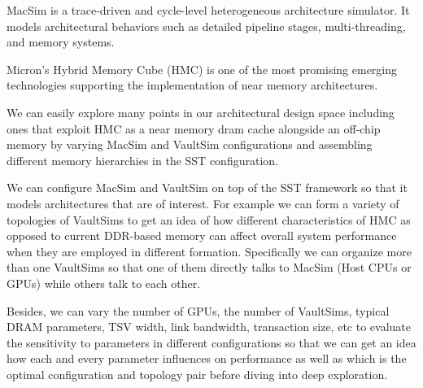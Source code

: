 MacSim \cite{macsim} is a trace-driven and cycle-level heterogeneous architecture simulator.
It models architectural behaviors such as detailed pipeline stages, multi-threading, and memory systems. 

Micron's Hybrid Memory Cube (HMC) \cite{hmc} is one of the most promising emerging technologies supporting the implementation of near memory architectures.

We can easily explore many points in our architectural design space including ones that exploit HMC as a near memory dram cache alongside an off-chip memory by varying MacSim and VaultSim configurations and assembling different memory hierarchies in the SST configuration.

We can configure MacSim and VaultSim on top of the SST framework so that it models architectures that are of interest.
For example we can form a variety of topologies of VaultSims to get an idea of how different characteristics of HMC as opposed to current DDR-based memory can affect overall system performance when they are employed in different formation.
Specifically we can organize more than one VaultSims so that one of them directly talks to MacSim (Host CPUs or GPUs) while others talk to each other.

Besides, we can vary the number of GPUs, the number of VaultSims, typical DRAM parameters, TSV width, link bandwidth, transaction size, etc to evaluate the sensitivity to parameters in different configurations so that we can get an idea how each and every parameter influences on performance as well as which is the optimal configuration and topology pair before diving into deep exploration.

